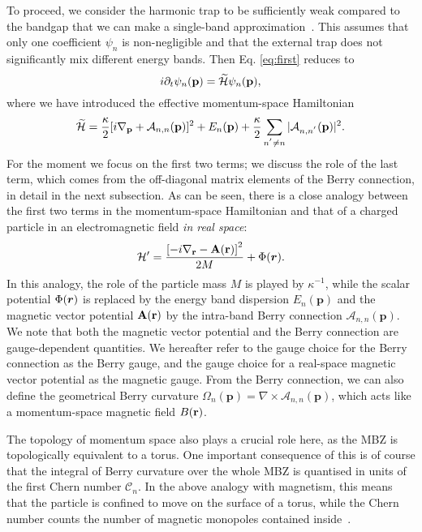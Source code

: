 To proceed, we consider the harmonic trap to be sufficiently weak compared to the bandgap that we can make a single-band approximation~\cite{price2014magnetic}. This assumes that only one coefficient $\psi_n$ is non-negligible and that the external trap does not significantly mix different energy bands. Then Eq. \ref{eq:first} reduces to
%
\begin{equation}
  i \partial_t \psi_n(\mathbf{p}) = \widetilde{\mathcal{H}} \psi_n(\mathbf{p}) ,
\end{equation}
where we have introduced the effective momentum-space Hamiltonian
%
\begin{equation}\label{eq:dual}
  \widetilde{\mathcal{H}} = \frac{\kappa}{2} [i\nabla_{\mathbf{p}} + \mathcal{A}_{n, n}(\mathbf{p})]^2 + E_n(\mathbf{p}) + \frac{\kappa}{2}\sum_{n^{'}\neq n} \vert \mathcal{A}_{n,n^{'}}(\mathbf{p}) \vert^2.
\end{equation}
%
For the moment we focus on the first two terms; we discuss the role of the last term, which comes from the off-diagonal matrix elements of the Berry connection, in detail in the next subsection.
As can be seen, there is a close analogy between the first two terms in the momentum-space Hamiltonian and that of a charged
particle in an electromagnetic field {\em in real space}:
%
\begin{equation}\label{eq:mag}
\mathcal{H}'= \frac{\left[-i\nabla_{\mathbf{r}} - \mathbf{A}(\mathbf{r})\right]^2}{2M} +  \Phi(\bm{r}). 
\end{equation}
%
In this analogy, the role of the particle mass $M$ is played by $\kappa^{-1}$, while the scalar potential $ \Phi(\bm{r})$ is replaced by the energy band dispersion $E_n(\mathbf{p})$ and the magnetic vector potential $\mathbf{A}(\mathbf{r})$ by the intra-band Berry connection $\mathcal{A}_{n, n}(\mathbf{p})$. We note that both the magnetic vector potential and the Berry connection are gauge-dependent quantities. We hereafter refer to the gauge choice for the Berry connection as the Berry gauge, and the gauge choice for a real-space magnetic vector potential as the magnetic gauge. From the Berry connection, we can also define the geometrical Berry curvature $\Omega_{n}(\mathbf{p}) =\nabla \times \mathcal{A}_{n, n}(\mathbf{p})$, which acts like a momentum-space magnetic field $B(\mathbf{r})$. 

The topology of momentum space also plays a crucial role here, as the MBZ is topologically equivalent to a torus. One important consequence of this is of course that the integral of Berry curvature over the whole MBZ is quantised in units of the first Chern number $\mathcal{C}_n$. In the above analogy with magnetism, this means that the particle is confined to move on the surface of a torus, while the Chern number counts the number of magnetic monopoles contained inside~\cite{Fang}. 

